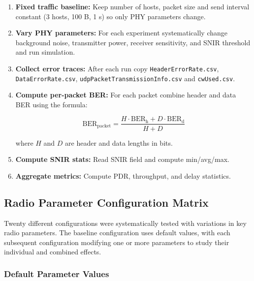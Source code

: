 \documentclass{article}
\begin{document}
\begin{enumerate}

  \item \textbf{Fixed traffic baseline:} Keep number of hosts, packet size and send interval constant (3 hosts, 100 B, 1 s) so only PHY parameters change.

  \item \textbf{Vary PHY parameters:} For each experiment systematically change background noise, transmitter power, receiver sensitivity, and SNIR threshold and run simulation.

  \item \textbf{Collect error traces:} After each run copy \texttt{HeaderErrorRate.csv}, \texttt{DataErrorRate.csv}, \texttt{udpPacketTransmissionInfo.csv} and \texttt{cwUsed.csv}.

  \item \textbf{Compute per-packet BER:} For each packet combine header and data BER using the formula:

  \[

    \mathrm{BER_{packet}} = \frac{H\cdot \mathrm{BER_h} + D\cdot \mathrm{BER_d}}{H+D}

  \]

  where $H$ and $D$ are header and data lengths in bits.

  \item \textbf{Compute SNIR stats:} Read SNIR field and compute min/avg/max.

  \item \textbf{Aggregate metrics:} Compute PDR, throughput, and delay statistics.

\end{enumerate}

\subsection{Radio Parameter Configuration Matrix}

Twenty different configurations were systematically tested with variations in key radio parameters. The baseline configuration uses default values, with each subsequent configuration modifying one or more parameters to study their individual and combined effects.

\subsubsection{Default Parameter Values}
\end{document}

